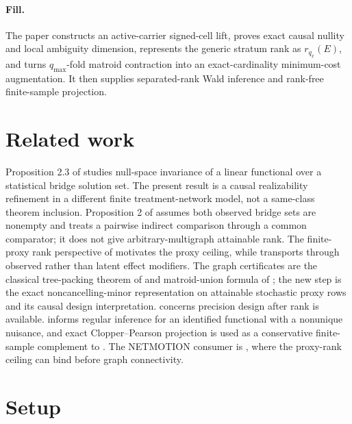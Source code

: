 \documentclass{article}
\begin{document}
\paragraph{Fill.} The paper constructs an active-carrier signed-cell lift, proves exact causal nullity and local ambiguity dimension, represents the generic stratum rank as \(r_{q_x}(E)\), and turns \(q_{\max}\)-fold matroid contraction into an exact-cardinality minimum-cost augmentation.  It then supplies separated-rank Wald inference and rank-free finite-sample projection.

\section{Related work}

Proposition 2.3 of \cite{ZhangLiMiaoTchetgen2023} studies null-space invariance of a linear functional over a statistical bridge solution set.  The present result is a causal realizability refinement in a different finite treatment-network model, not a same-class theorem inclusion.  Proposition 2 of \cite{SuRytgaardRavnEriksson2026} assumes both observed bridge sets are nonempty and treats a pairwise indirect comparison through a common comparator; it does not give arbitrary-multigraph attainable rank.  The finite-proxy rank perspective of \cite{MiaoGengTchetgen2018} motivates the proxy ceiling, while \cite{DahabrehRobertsonPetitoHernanSteingrimsson2023} transports through observed rather than latent effect modifiers.  The graph certificates are the classical tree-packing theorem of \cite{NashWilliams1961} and matroid-union formula of \cite{Edmonds1965}; the new step is the exact noncancelling-minor representation on attainable stochastic proxy rows and its causal design interpretation.  \cite{Rosa2018} concerns precision design after rank is available.  \cite{BennettEtAl2023} informs regular inference for an identified functional with a nonunique nuisance, and exact Clopper--Pearson projection is used as a conservative finite-sample complement to \cite{KaidoMolinariStoye2019}.  The NETMOTION consumer is \cite{SotiropoulosEtAl2024}, where the proxy-rank ceiling can bind before graph connectivity.

\section{Setup}
\end{document}
